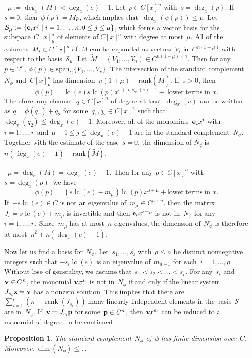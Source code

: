 \documentclass{sig-alternate}
\newtheorem{prop}[theorem]{Proposition}
\newcommand{\red}{\color{red}}
\newcommand{\cS}{ {\mathcal S}}
\newcommand{\ve} {{\bf e}}
\newcommand{\vp} {{\bf p}}
\newcommand{\vv} {{\bf v}}
\newcommand{\vx} {{\bf x}}
\def\lc{\operatorname{lc}}
\def\rank{\operatorname{rank}}
\begin{document}
~$\mu := \deg_x(M)<\deg_x(e)-1$. Let~$p\in C[x]^n$ with~$s=\deg_x(p)$.
If~$s=0$, then~$\phi(p) = Mp$, which implies that~$\deg_x(\phi(p))\leq \mu$.
Let~$\cS_\mu := \{\ve_i x^j \mid i=1, \ldots, n, 0\leq j\leq \mu\}$, which forms a vector basis
for the subspace~$C[x]_\mu^n$ of elements of $C[x]^n$ with degree at most~$\mu$. All of the columns~$M_i\in C[x]^n$ of~$M$
can be expanded as vectors~$V_i$ in~$C^{n(1+\mu)}$ with respect to the basis~$\cS_\mu$. Let~$\tilde{M} = (V_1, \ldots, V_n)\in C^{n(1+\mu) \times n}$.
Then for any~$p\in C^n$, $\phi(p) \in \text{span}_C\{V_1, \ldots, V_n\}$. The intersection of the standard complement~$N_\phi$
and~$C[x]_\mu^n$ has dimension~$n(1+\mu)-\text{rank}(\tilde{M})$. If~$s>0$, then
\[\phi(p)=\lc(e)s\lc(p)x^{s+\deg_x(e)-1} +~ \text{lower terms in~$x$}.\]
Therefore, any element~$q\in C[x]^n$ of degree at least~$\deg_x(e)$ can be written as
$q = \phi(q_1) + q_2$ for some~$q_1, q_2\in C[x]^n$ such that~$\deg_x(q_2)\leq \deg_x(e)-1$.
Moreover, all of the monomials~$\ve_ix^j$ with~$i=1, \ldots, n$ and~$\mu+1\leq j\leq \deg_x(e)-1$
are in the standard complement~$N_\phi$. Together with the estimate of the case~$s=0$, the dimension of
$N_\phi$ is $n(\deg_x(e)-1)-\text{rank}(\tilde{M})$.


~$\mu =\deg_x(M)=\deg_x(e)-1$. Then for any~$p\in C[x]^n$ with~$s=\deg_x(p)$, we have
\[\phi(p) = (s\lc(e) + m_{\mu})\lc(p)x^{s+\mu}+\text{lower terms in~$x$}.\]
If~$-s\lc(e)\in C$ is not an eigenvalue of~$m_{\mu}\in C^{n\times n}$, then
the matrix~$J_s = s\lc(e) + m_{\mu}$ is invertible and then $\ve_ix^{s+\mu}$ is not in~$N_\phi$
for any~$i=1, \ldots, n$. Since~$m_\mu$ has at most~$n$ eigenvalues, the dimension of~$N_\phi$
is therefore at most~$n^2+n(\deg_x(e)-1)$.

Now let us find a basis for~$N_\phi$. Let~$s_1, \ldots, s_\rho$ with~$\rho\leq n$ be distinct nonnegative integers such that
$-s_i\lc(e)$ is an eigenvalue of~$m_{d-1}$ for each~$i=1, \ldots, \rho$.
Without lose of generality,
we assume that~$s_1 <s_2<\ldots<s_\rho$. For any~$s_i$ and~$\vv\in C^n$, the monomial $\vv x^{s_i}$ is not in~$N_\phi$
if and only if the linear system~$J_{s_i}\vx = \vv$
has a nonzero solution. This implies that there are $\sum_{i=1}^\rho (n-\rank(J_{s_i}))$ many linearly
independent elements in the basis~$\cS$ are in~$N_\phi$. If~$\vv = J_{s_i} \vp$ for some~$\vp\in C^n$, then
$\vv x^{s_i}$ can be reduced to a monomial of degree {\red To be continued...}

\begin{prop}\label{prop:Nphi}
The standard complement~$N_\phi$ of~$\phi$ has finite dimension over~$C$. Moreover,
$\dim(N_\phi) \leq ...$
\end{prop}
\end{document}
